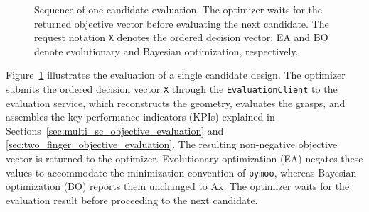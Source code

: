 \begin{figure}[H]
\centering
{}
\caption{Sequence of one candidate evaluation. The optimizer waits for the
returned objective vector before evaluating the next candidate.
The request notation \texttt{X} denotes the ordered decision vector;
EA and BO denote evolutionary and Bayesian optimization, respectively.}
\label{fig:evaluation_sequence}
\end{figure}

Figure~\ref{fig:evaluation_sequence} illustrates the evaluation of a single candidate design. The optimizer submits the ordered decision vector
\texttt{X} through the \texttt{EvaluationClient} to the evaluation service, which reconstructs the geometry, evaluates the grasps, and assembles the
key performance indicators (KPIs) explained in Sections~\ref{sec:multi_sc_objective_evaluation} and \ref{sec:two_finger_objective_evaluation}. The resulting
non-negative objective vector is returned to the optimizer. Evolutionary optimization (EA) negates these values to accommodate the minimization
convention of \texttt{pymoo}, whereas Bayesian optimization (BO) reports them unchanged to Ax. The optimizer waits for the evaluation result before
proceeding
to the next candidate.


